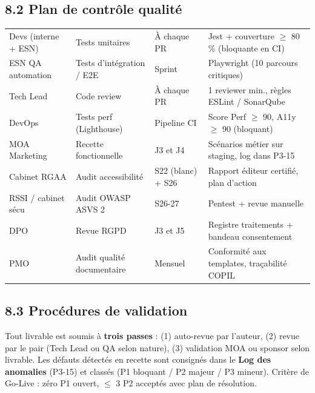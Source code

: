 \documentclass[11pt,a4paper,oneside]{report}
\begin{document}
\subsection*{8.2 Plan de contrôle qualité}
\renewcommand{\arraystretch}{1.4}
\begin{tabularx}{\textwidth}{L{3cm} L{3cm} L{3cm} Y}
\toprule
{} &  &  &  \\
\midrule
Devs (interne + ESN)    & Tests unitaires             & À chaque PR    & Jest + couverture $\geq$ 80\,\% (bloquante en CI) \\
ESN QA automation       & Tests d'intégration / E2E   & Sprint                & Playwright (10 parcours critiques) \\
Tech Lead               & Code review                 & À chaque PR    & 1 reviewer min., règles ESLint / SonarQube \\
DevOps                  & Tests perf (Lighthouse)     & Pipeline CI    & Score Perf $\geq$ 90, A11y $\geq$ 90 (bloquant) \\
MOA Marketing           & Recette fonctionnelle       & J3 et J4              & Scénarios métier sur staging, log dans P3-15 \\
Cabinet RGAA            & Audit accessibilité         & S22 (blanc) + S26      & Rapport éditeur certifié, plan d'action \\
RSSI / cabinet sécu     & Audit OWASP ASVS 2          & S26-27                 & Pentest + revue manuelle \\
DPO                     & Revue RGPD                  & J3 et J5              & Registre traitements + bandeau consentement \\
PMO                     & Audit qualité documentaire  & Mensuel                & Conformité aux templates, traçabilité COPIL \\
\bottomrule
\end{tabularx}

\subsection*{8.3 Procédures de validation}
Tout livrable est soumis à \textbf{trois passes} : (1) auto-revue par l'auteur, (2) revue par le pair (Tech Lead ou QA selon nature), (3) validation MOA ou sponsor selon livrable. Les défauts détectés en recette sont consignés dans le \textbf{Log des anomalies} (P3-15) et classés (P1 bloquant / P2 majeur / P3 mineur). Critère de Go-Live : zéro P1 ouvert, $\leq$ 3 P2 acceptés avec plan de résolution.
\end{document}

